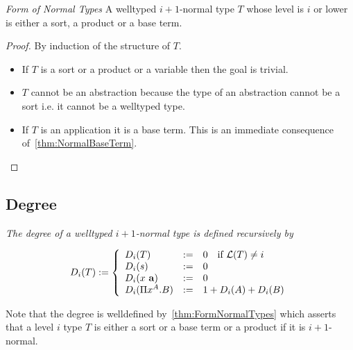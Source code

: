 \begin{theorem}
    \label{thm:FormNormalTypes}
    \emph{Form of Normal Types} A welltyped $i+1$-normal type $T$ whose level is
    $i$ or lower is either a sort, a product or a base term.


    \begin{proof}
        By induction of the structure of $T$.
        \begin{itemize}

            \item If $T$ is a sort or a product or a variable then the goal is
                trivial.

            \item $T$ cannot be an abstraction because the type of an
                abstraction cannot be a sort i.e. it cannot be a welltyped type.

            \item If $T$ is an application it is a base term. This is an
                immediate consequence of~\ref{thm:NormalBaseTerm}.
        \end{itemize}
    \end{proof}
\end{theorem}








\subsection{Degree}

\begin{definition}
    \label{def:TypeDegree}
    \emph{The degree of a welltyped $i+1$-normal type is defined recursively by}

    $$
    D_i(T) :=
    \dcases{
        D_i(T) &:=& 0 \quad\text{if } \Level(T) \ne i
        \\
        D_i(s) &:=& 0
        \\
        D_i(x \vec a) &:=& 0
        \\
        D_i(\Pi x^A.B) &:=&
        1 + D_i(A) +  D_i(B)
    }
    $$

    Note that the degree is welldefined by~\ref{thm:FormNormalTypes} which
    asserts that a level $i$ type $T$ is either a sort or a base term or a
    product if it is $i+1$-normal.
\end{definition}



